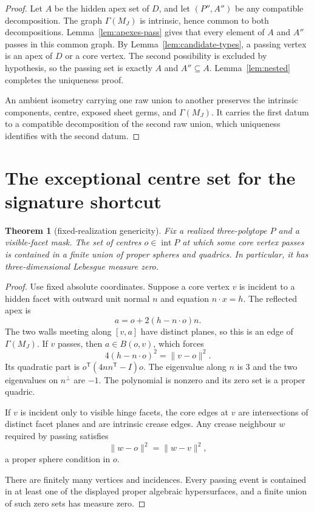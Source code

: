 \documentclass[11pt]{amsart}
\newtheorem{theorem}{Theorem}[section]
\theoremstyle{definition}
\newcommand{\GammaM}{\Gamma(M_J)}
\begin{document}
\begin{proof}
Let $A$ be the hidden apex set of $D$, and let $(P'',A'')$ be any compatible
decomposition.  The graph $\GammaM$ is intrinsic, hence common to both
decompositions.  Lemma~\ref{lem:apexes-pass} gives that every element of $A$
and $A''$ passes in this common graph.  By Lemma~\ref{lem:candidate-types}, a
passing vertex is an apex of $D$ or a core vertex.  The second possibility is
excluded by hypothesis, so the passing set is exactly $A$ and $A''\subseteq A$.
Lemma~\ref{lem:nested} completes the uniqueness proof.

An ambient isometry carrying one raw union to another preserves the intrinsic
components, centre, exposed sheet germs, and $\GammaM$.  It carries the first
datum to a compatible decomposition of the second raw union, which uniqueness
identifies with the second datum.
\end{proof}

\section{The exceptional centre set for the signature shortcut}
\label{sec:genericity}

\begin{theorem}[fixed-realization genericity]
\label{thm:genericity}
Fix a realized three-polytope $P$ and a visible-facet mask.  The set of centres
$o\in\operatorname{int}P$ at which some core vertex passes is contained in a
finite union of proper spheres and quadrics.  In particular, it has
three-dimensional Lebesgue measure zero.
\end{theorem}

\begin{proof}
Use fixed absolute coordinates.  Suppose a core vertex $v$ is incident to a
hidden facet with outward unit normal $n$ and equation $n\cdot x=h$.  The
reflected apex is
\[
 a=o+2(h-n\cdot o)n.
\]
The two walls meeting along $[v,a]$ have distinct planes, so this is an edge of
$\GammaM$.  If $v$ passes, then $a\in B(o,v)$, which forces
\[
 4(h-n\cdot o)^2=\|v-o\|^2.
\]
Its quadratic part is $o^{\mathsf T}(4nn^{\mathsf T}-I)o$.  The eigenvalue
along $n$ is $3$ and the two eigenvalues on $n^\perp$ are $-1$.  The polynomial
is nonzero and its zero set is a proper quadric.

If $v$ is incident only to visible hinge facets, the core edges at $v$ are
intersections of distinct facet planes and are intrinsic crease edges.  Any
crease neighbour $w$ required by passing satisfies
\[
 \|w-o\|^2=\|w-v\|^2,
\]
a proper sphere condition in $o$.

There are finitely many vertices and incidences.  Every passing event is
contained in at least one of the displayed proper algebraic hypersurfaces, and
a finite union of such zero sets has measure zero.
\end{proof}
\end{document}
